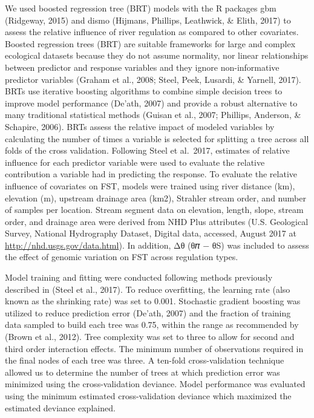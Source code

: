 \documentclass[twoside,12pt,final]{ucthesis-CA2012}
\begin{document}
\begin{ucmainmatter}
We used boosted regression tree (BRT) models with the R packages gbm
(Ridgeway, 2015) and dismo (Hijmans, Phillips, Leathwick, \& Elith,
2017) to assess the relative influence of river regulation as compared
to other covariates. Boosted regression trees (BRT) are suitable
frameworks for large and complex ecological datasets because they do not
assume normality, nor linear relationships between predictor and
response variables and they ignore non-informative predictor variables
(Graham et al., 2008; Steel, Peek, Lusardi, \& Yarnell, 2017). BRTs use
iterative boosting algorithms to combine simple decision trees to
improve model performance (De'ath, 2007) and provide a robust
alternative to many traditional statistical methods (Guisan et al.,
2007; Phillips, Anderson, \& Schapire, 2006). BRTs assess the relative
impact of modeled variables by calculating the number of times a
variable is selected for splitting a tree across all folds of the cross
validation. Following Steel et al.~2017, estimates of relative influence
for each predictor variable were used to evaluate the relative
contribution a variable had in predicting the response. To evaluate the
relative influence of covariates on FST, models were trained using river
distance (km), elevation (m), upstream drainage area (km2), Strahler
stream order, and number of samples per location. Stream segment data on
elevation, length, slope, stream order, and drainage area were derived
from NHD Plus attributes (U.S. Geological Survey, National Hydrography
Dataset, Digital data, accessed, August 2017 at
\url{http://nhd.usgs.gov/data.html}). In addition, Δθ (θ𝜋 − θS) was
included to assess the effect of genomic variation on FST across
regulation types.

Model training and fitting were conducted following methods previously
described in (Steel et al., 2017). To reduce overfitting, the learning
rate (also known as the shrinking rate) was set to 0.001. Stochastic
gradient boosting was utilized to reduce prediction error (De'ath, 2007)
and the fraction of training data sampled to build each tree was 0.75,
within the range as recommended by (Brown et al., 2012). Tree complexity
was set to three to allow for second and third order interaction
effects. The minimum number of observations required in the final nodes
of each tree was three. A ten-fold cross-validation technique allowed us
to determine the number of trees at which prediction error was minimized
using the cross-validation deviance. Model performance was evaluated
using the minimum estimated cross-validation deviance which maximized
the estimated deviance explained.


\end{ucmainmatter}
\end{document}
